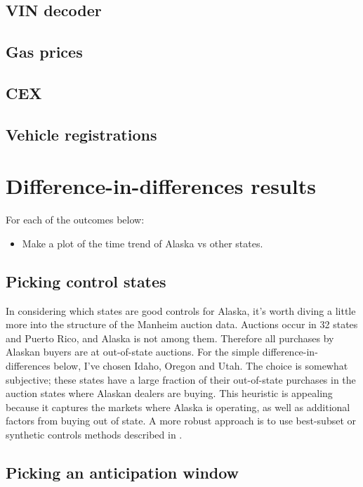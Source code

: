 \documentclass[11pt,letterpaper,oneside]{article}
\begin{document}
\subsection{VIN decoder}
\subsection{Gas prices}
\subsection{CEX}
\subsection{Vehicle registrations}


\section[DD Results]{Difference-in-differences results}

For each of the outcomes below:
\begin{itemize}
    \item Make a plot of the time trend of Alaska vs other states.
\end{itemize}


\subsection{Picking control states}
In considering which states are good controls for Alaska, it's worth diving a little more into the structure of the Manheim auction data.
Auctions occur in 32 states and Puerto Rico, and Alaska is not among them.
Therefore all purchases by Alaskan buyers are at out-of-state auctions.
For the simple difference-in-differences below, I've chosen Idaho, Oregon and Utah.
The choice is somewhat subjective; these states have a large fraction of their out-of-state purchases in the auction states where Alaskan dealers are buying.
This heuristic is appealing because it captures the markets where Alaska is operating, as well as additional factors from buying out of state.
A more robust approach is to use best-subset or synthetic controls methods described in \textcite{DoudchenkoImbens2016DD}.


\subsection{Picking an anticipation window}
\end{document}
